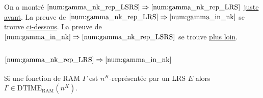 \documentclass{report}
\newcommand{\dtimeramarg}[1]{\text{DTIME}_{\text{RAM}}\left( n^{#1} \right)}
\begin{document}
	On a montré $\ref{num:gamma_nk_rep_LSRS} \Rightarrow \ref{num:gamma_nk_rep_LRS}$ \hyperref[conj:rep_LSRS_rep_LRS]{juste avant}. 
	La preuve de $\ref{num:gamma_nk_rep_LRS} \Rightarrow \ref{num:gamma_in_nk}$ se trouve \hyperref[conj:rep_LRS_calc_n_K]{ci-dessous}.
	La preuve de $\ref{num:gamma_in_nk} \Rightarrow \ref{num:gamma_nk_rep_LSRS}$ se trouve \hyperref[conj:poly_implique_LSRS]{plus loin}.
	
	
	\subsection{$\ref{num:gamma_nk_rep_LRS} \Rightarrow \ref{num:gamma_in_nk}$}
		\label{subsec:LRS_implique_poly}
		
		\begin{conj}
			\label{conj:rep_LRS_calc_n_K}
			Si une fonction de RAM $\Gamma$ est $n^K$-représentée par un LRS $E$ alors $\Gamma \in \dtimeramarg{K}$.
		\end{conj}
		
\end{document}
